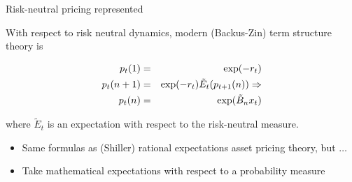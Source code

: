 \documentclass{beamer}
\theoremstyle{Definition}
\begin{document}
\begin{frame}{Risk-neutral pricing represented}

With respect to risk neutral dynamics, modern (Backus-Zin) term structure theory
is


\begin{eqnarray*}
p_t(1) &= &\exp(- r_t) \cr
p_t(n+1) & = & \exp(-r_t) \tilde E_t ( p_{t+1}(n)) \Rightarrow \cr
p_t(n) & = & \exp(\tilde B_n x_t)
\end{eqnarray*}

where $\tilde E_t$ is an expectation with respect to the risk-neutral  measure.

\begin{itemize}
\item Same formulas as (Shiller) rational expectations asset pricing theory, but $\ldots$
 \item Take mathematical expectations with respect to a   probability measure \color{red}{twisted by risk-aversion}
\end{itemize}
\end{frame}

%
%
%
%
%
\end{document}
